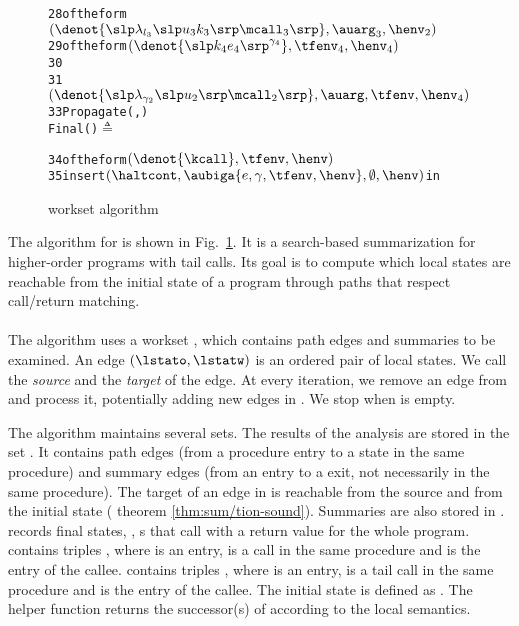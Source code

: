 \documentclass{LMCS}
\theoremstyle{definition} \newtheorem{property}[thm]{Property}
\begin{document}
\begin{figure}[!t]
{\begin{alltt}
          28      \lstath of the form  \((\denot{\slp\lambda\sb{l\sb{3}}\slp\mbox{}u\sb{3} k\sb{3}\srp \mcall\sb{3}\srp} , \auarg\sb{3}, \henv\sb{2})\)
          29      \lstatf of the form  \((\denot{\slp\mbox{}k\sb{4} e\sb{4}\srp\sp{\gamma\sb{4}}}, \tfenv\sb{4}, \henv\sb{4})\)
          30      \auarg \assgn  {}
          31      \tfenv \assgn  {}      \lstat \assgn  \((\denot{\slp\mbox{}\lambda\sb{\gamma\sb{2}}\slp\mbox{}u\sb{2}\srp \mcall\sb{2}\srp}, \auarg, \tfenv, \henv\sb{4})\)
          33      Propagate(\lstato, \lstat)  
                Final(\lstat) \(\triangleq\)  \rule{0cm}{0.45cm}
          34      \lstat of the form  \((\denot{\kcall}, \tfenv, \henv)\)
          35      insert  \((\haltcont, \aubiga{e, \gamma, \tfenv, \henv}, \emptyset, \henv)\) in \finals 
\end{alltt}
}
\caption{\cfat{} workset algorithm\label{fig:workset}}
\end{figure}

The algorithm for \cfat{} is shown in Fig.~\ref{fig:workset}.
It is a search-based summarization for higher-order programs with tail calls.
Its goal is to compute which local states are reachable from the initial 
state of a program through paths that respect call/return matching.

\paragraph{}
The algorithm uses a workset \work, which contains path edges and summaries to
be examined.
An edge $(\lstato, \lstatw)$ is an ordered pair of local states.
We call \lstato{} the \emph{source} and \lstatw{} the \emph{target} of the edge.
At every iteration, we remove an edge from \work{} and process it, potentially 
adding new edges in \work.
We stop when \work{} is empty.

The algorithm maintains several sets.
The results of the analysis are stored in the set \seen.
It contains path edges (from a procedure entry to a state in the same procedure)
and summary edges (from an entry to a \dlceval{} exit, not necessarily in the
same procedure).
The target of an edge in \seen{} is reachable from the source and from the
initial state (\confer{} the\-o\-rem \ref{thm:sum/tion-sound}).
Summaries are also stored in \summary.
\finals{} records final states, \ie, \dlcapply s that call \haltcont{} with a 
return value for the whole program.
\callers{} contains triples \tuple{\lstato, \lstatw, \lstath}, where \lstato{}
is an entry, \lstatw{} is a call in the same procedure and \lstath{} is the
entry of the callee.
\tcallers{} contains triples \tuple{\lstato, \lstatw, \lstath}, where \lstato{}
is an entry, \lstatw{} is a tail call in the same pro\-ce\-dure and \lstath{} 
is the entry of the callee.
The initial state \linitstate{} is defined as \ctol{\initstate}.
The helper function \succ{\lstat} returns the successor(s) of \lstat{} according
to the local semantics.
\end{document}
